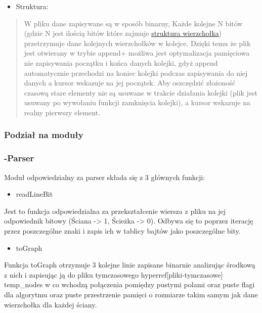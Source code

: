 \documentclass[
]{article}
\begin{document}
\begin{itemize}
\item
  Struktura:
\end{itemize}

\begin{quote}
W pliku dane zapisywane są w sposób binarny, Każde kolejne N bitów
(gdzie N jest ilością bitów które zajmuje \hyperref[struktury-programu]{struktura
wierzchołka}) przetrzymuje dane kolejnych
wierzchołków w kolejce. Dzięki temu że plik jest otwierany w trybie
append+ możliwa jest optymalizacja pamięciowa nie zapisywania początku i
końca danych kolejki, gdyż append automatycznie przechodzi na koniec
kolejki podczas zapisywania do niej danych a kursor wskazuje na jej
początek. Aby oszczędzić złożoność czasową stare elementy nie są usuwane
w trakcie działania kolejki (plik jest usuwany po wywołaniu funkcji
zamknięcia kolejki), a kursor wskazuje na realny pierwszy element.
\end{quote}

\hypertarget{podziaux142-na-moduux142y}{%
\subsubsection{\texorpdfstring{Podział na moduły
}{Podział na moduły }}\label{podziaux142-na-moduux142y}}

\hypertarget{parser}{%
\subsubsection{-Parser}\label{parser}}

Moduł odpowiedzialny za parser składa się z 3 głównych funkcji:

\begin{itemize}
\item
  readLineBit
\end{itemize}

Jest to funkcja odpowiedzialna za przekształcenie wiersza z pliku na jej
odpowiednik bitowy (Ściana -\textgreater{} 1, Ścieżka -\textgreater{}
0). Odbywa się to poprzez iterację przez poszczególne znaki i zapis ich
w tablicy bajtów jako poszczególne bity.

\begin{itemize}
\item
  toGraph
\end{itemize}

Funkcja toGraph otrzymuje 3 kolejne linie zapisane binarnie analizując
środkową z nich i zapisując ją do pliku tymczasowego hyperref[pliki-tymczasowe]{ temp\_nodes}
w co wchodzą połączenia pomiędzy pustymi polami oraz puste
flagi dla algorytmu oraz puste przestrzenie pamięci o rozmiarze takim
samym jak dane wierzchołka dla każdej ściany.
\end{document}
